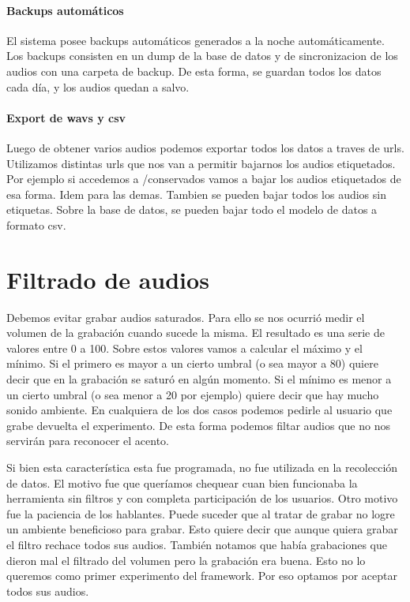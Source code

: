 \documentclass[11pt,a4paper,twoside]{tesis}
\begin{document}
\paragraph{Backups automáticos}

El sistema posee backups automáticos generados a la noche automáticamente. Los backups consisten en un dump de la base de datos y de sincronizacion de los audios con una carpeta de backup. De esta forma, se guardan todos los datos cada día, y los audios quedan a salvo.

\paragraph{Export de wavs y csv}

Luego de obtener varios audios podemos exportar todos los datos a traves de urls. Utilizamos distintas urls que nos van a permitir bajarnos los audios etiquetados. Por ejemplo si accedemos a /conservados vamos a bajar los audios etiquetados de esa forma. Idem para las demas. Tambien se pueden bajar todos los audios sin etiquetas. Sobre la base de datos, se pueden bajar todo el modelo de datos a formato csv.

\section{Filtrado de audios}

Debemos evitar grabar audios saturados. Para ello se nos ocurrió medir el volumen de la grabación cuando sucede la misma. El resultado es una serie de valores entre 0 a 100. Sobre estos valores vamos a calcular el máximo y el mínimo. Si el primero es mayor a un cierto umbral (o sea mayor a 80) quiere decir que en la grabación se saturó en algún momento. Si el mínimo es menor a un cierto umbral (o sea menor a 20 por ejemplo) quiere decir que hay mucho sonido ambiente. En cualquiera de los dos casos podemos pedirle al usuario que grabe devuelta el experimento. De esta forma podemos filtar audios que no nos servirán para reconocer el acento.

Si bien esta característica esta fue programada, no fue utilizada en la recolección de datos. El motivo fue que queríamos chequear cuan bien funcionaba la herramienta sin filtros y con completa participación de los usuarios. Otro motivo fue la paciencia de los hablantes. Puede suceder que al tratar de grabar no logre un ambiente beneficioso para grabar. Esto quiere decir que aunque quiera grabar el filtro rechace todos sus audios. También notamos que había grabaciones que dieron mal el filtrado del volumen pero la grabación era buena. Esto no lo queremos como primer experimento del framework. Por eso optamos por aceptar todos sus audios.
\end{document}
